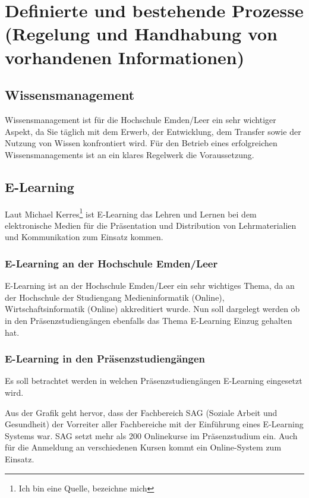 \section{Definierte und bestehende Prozesse (Regelung und Handhabung von vorhandenen Informationen)}

\subsection{Wissensmanagement}
Wissensmanagement ist für die Hochschule Emden/Leer ein sehr wichtiger Aspekt, da Sie täglich mit dem Erwerb, der Entwicklung, dem Transfer sowie der Nutzung von Wissen konfrontiert wird. Für den Betrieb eines erfolgreichen Wissensmanagements ist an ein klares Regelwerk die Voraussetzung.

\subsection{E-Learning}
Laut Michael Kerres\footnote{Ich bin eine Quelle, bezeichne mich} ist E-Learning das Lehren und Lernen bei dem elektronische Medien für die Präsentation und Distribution von Lehrmaterialien und Kommunikation zum Einsatz kommen.

\subsubsection{E-Learning an der Hochschule Emden/Leer}
E-Learning ist an der Hochschule Emden/Leer ein sehr wichtiges Thema, da an der Hochschule der Studiengang Medieninformatik (Online), Wirtschaftsinformatik (Online) akkreditiert  wurde. Nun soll dargelegt werden ob in den Präsenzstudiengängen ebenfalls das Thema E-Learning Einzug gehalten hat.

\subsubsection{E-Learning in den Präsenzstudiengängen}
Es soll betrachtet werden in welchen Präsenzstudiengängen E-Learning eingesetzt wird.


Aus der Grafik geht hervor, dass der Fachbereich SAG (Soziale Arbeit und Gesundheit) der Vorreiter aller Fachbereiche mit der Einführung eines E-Learning Systems war. SAG setzt mehr als 200 Onlinekurse im Präsenzstudium ein. Auch für die Anmeldung an verschiedenen Kursen kommt ein Online-System zum Einsatz.

